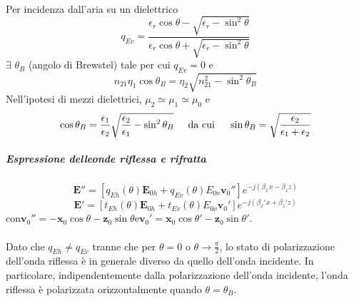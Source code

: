 \documentclass[a4paper]{article}
\begin{document}
\begin{itemize}
\begin{equation*}
\begin{array}{lr}
\end{array}
\end{equation*}
Per incidenza dall'aria su un dielettrico
\begin{equation*}
q_{Ev}=\frac{\epsilon_r\cos\theta-\sqrt{\epsilon_r-\sin^2\theta}}{\epsilon_r\cos\theta+\sqrt{\epsilon_r-\sin^2\theta}}
\end{equation*}
$\exists\,\,\theta_B$ (angolo di Brewstel) tale per cui $q_{Ev}=0$ e
\begin{equation*}
n_{21}\eta_1\cos\theta_B=\eta_2\sqrt{n_{21}^2-\sin^2\theta_B}
\end{equation*}
Nell'ipotesi di mezzi dielettrici, $\mu_2\simeq\mu_1\simeq\mu_0$ e
\begin{equation*}
\cos\theta_B=\frac{\epsilon_1}{\epsilon_2}\sqrt{\frac{\epsilon_2}{\epsilon_1}-\sin^2\theta_B}\hspace*{5mm}\text{da cui}\hspace{5mm}\sin\theta_B=\sqrt{\frac{\epsilon_2}{\epsilon_1+\epsilon_2}}
\end{equation*}
\end{itemize}
\subparagraph*{Espressione delleonde riflessa e rifratta\\}
\begin{equation*}
\textbf{E}''=[q_{Eh}(\theta)\textbf{E}_{0h}+q_{Ev}(\theta)E_{0v}\textbf{v}_0'']e^{-j(\beta_xx-\beta_zz)}
\end{equation*}
\begin{equation*}
\textbf{E}'=[t_{Eh}(\theta)\textbf{E}_{0h}+t_{Ev}(\theta)E_{0v}\textbf{v}_0']e^{-j(\beta_x'x+\beta_z'z)}
\end{equation*}
con\hspace{5mm}$\textbf{v}_0''=-\textbf{x}_0\cos\theta-\textbf{z}_0\sin\theta$\hspace{5mm}e\hspace{5mm}$\textbf{v}_0'=\textbf{x}_0\cos\theta'-\textbf{z}_0\sin\theta'$.\\\\
Dato che $q_{Eh}\neq q_{Ev}$ tranne che per $\theta=0$ o $\theta\rightarrow\frac{\pi}{2}$, lo stato di polarizzazione dell'onda riflessa è in generale diverso da quello dell'onda incidente. In particolare, indipendentemente dalla polarizzazione dell'onda incidente, l'onda riflessa è polarizzata orizzontalmente quando $\theta=\theta_B$.
\end{document}
